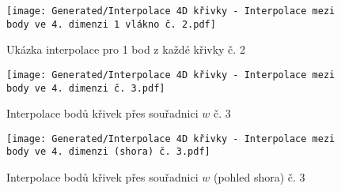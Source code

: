 \begin{imagepage}
    \begin{figure}[H]
        \centering
        \texttt{[image: Generated/Interpolace 4D křivky - Interpolace mezi body ve 4. dimenzi 1 vlákno č. 2.pdf]}
        \caption{Ukázka interpolace pro 1 bod z každé křivky č. 2}
        \label{fig:Demo 4D Interpolace mezi body přes souřadnici w konst x 2}
    \end{figure}
\end{imagepage}
\begin{imagepage}
    \begin{figure}[H]
        \centering
        \texttt{[image: Generated/Interpolace 4D křivky - Interpolace mezi body ve 4. dimenzi č. 3.pdf]}
        \caption{Interpolace bodů křivek přes souřadnici $w$ č. 3 }
        \label{fig:Demo 4D Interpolace mezi body přes souřadnici w 3}
    \end{figure}
    \begin{figure}[H]
        \centering
        \texttt{[image: Generated/Interpolace 4D křivky - Interpolace mezi body ve 4. dimenzi (shora) č. 3.pdf]}
        \caption{Interpolace bodů křivek přes souřadnici $w$ (pohled shora) č. 3}
        \label{fig:Demo 4D Interpolace mezi body přes souřadnici w shora 3}
    \end{figure}
\end{imagepage}

